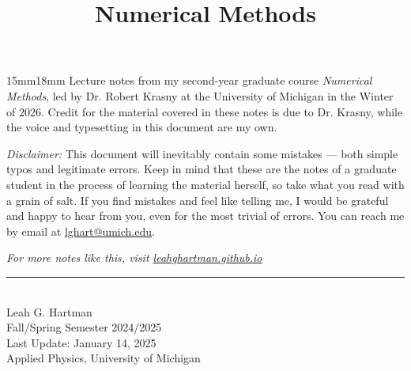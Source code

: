 \documentclass[a4paper,11pt]{article}
\title{Numerical Methods \vspace{-2.5em}}
\date{}
\begin{document}
  \maketitle
  \thispagestyle{empty}

  \begin{adjustwidth}{15mm}{18mm}
    \hspace{1.4em} Lecture notes from my second-year graduate course \textit{Numerical Methods}, led by Dr. Robert Krasny at the University of Michigan in the Winter of 2026. Credit for the material covered in these notes is due to Dr. Krasny, while the voice and typesetting in this document are my own.

    \hspace{1.4em} \textit{Disclaimer:} This document will inevitably contain some mistakes ---  both simple typos and legitimate errors. Keep in mind that these are the notes of a graduate student in the process of learning the material herself, so take what you read with a grain of salt. If you find mistakes and feel like telling me, I would be grateful and happy to hear from you, even for the most trivial of errors. You can reach me by email at \href{mailto:lghart@umich.edu}{lghart@umich.edu}.
  \end{adjustwidth}

\vspace{12cm}

  \begin{center}
    \textit{For more notes like this, visit \href{https://leahghartman.github.io/academics/}{leahghartman.github.io}}
    \rule{0.75\textwidth}{0.5pt} \\
    Leah G. Hartman \\
    Fall/Spring Semester 2024/2025 \\
    Last Update: January 14, 2025 \\
    Applied Physics, University of Michigan 
  \end{center}

  \newpage
  \tableofcontents

  \clearpage
  \newpage


  

\end{document}
